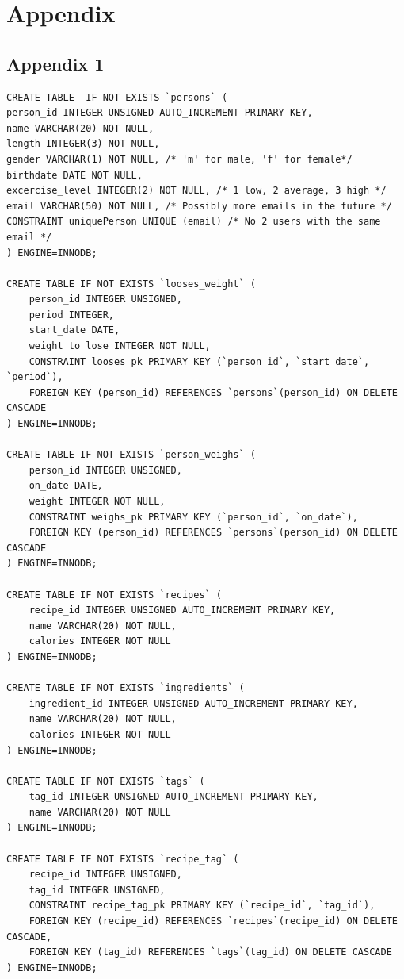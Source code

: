 \documentclass{article}
\begin{document}
\section*{Appendix}
\subsection*{Appendix 1}
\begin{lstlisting}[caption=Script of database]
CREATE TABLE  IF NOT EXISTS `persons` (
person_id INTEGER UNSIGNED AUTO_INCREMENT PRIMARY KEY,
name VARCHAR(20) NOT NULL,
length INTEGER(3) NOT NULL,
gender VARCHAR(1) NOT NULL, /* 'm' for male, 'f' for female*/
birthdate DATE NOT NULL,
excercise_level INTEGER(2) NOT NULL, /* 1 low, 2 average, 3 high */
email VARCHAR(50) NOT NULL, /* Possibly more emails in the future */
CONSTRAINT uniquePerson UNIQUE (email) /* No 2 users with the same email */
) ENGINE=INNODB;

CREATE TABLE IF NOT EXISTS `looses_weight` (
    person_id INTEGER UNSIGNED,
    period INTEGER,
    start_date DATE,
    weight_to_lose INTEGER NOT NULL,
    CONSTRAINT looses_pk PRIMARY KEY (`person_id`, `start_date`, `period`),
    FOREIGN KEY (person_id) REFERENCES `persons`(person_id) ON DELETE CASCADE
) ENGINE=INNODB;

CREATE TABLE IF NOT EXISTS `person_weighs` (
    person_id INTEGER UNSIGNED,
    on_date DATE,
    weight INTEGER NOT NULL,
    CONSTRAINT weighs_pk PRIMARY KEY (`person_id`, `on_date`),
    FOREIGN KEY (person_id) REFERENCES `persons`(person_id) ON DELETE CASCADE
) ENGINE=INNODB;

CREATE TABLE IF NOT EXISTS `recipes` (
    recipe_id INTEGER UNSIGNED AUTO_INCREMENT PRIMARY KEY,
    name VARCHAR(20) NOT NULL,
    calories INTEGER NOT NULL
) ENGINE=INNODB;

CREATE TABLE IF NOT EXISTS `ingredients` (
    ingredient_id INTEGER UNSIGNED AUTO_INCREMENT PRIMARY KEY,
    name VARCHAR(20) NOT NULL,
    calories INTEGER NOT NULL
) ENGINE=INNODB;

CREATE TABLE IF NOT EXISTS `tags` (
    tag_id INTEGER UNSIGNED AUTO_INCREMENT PRIMARY KEY,
    name VARCHAR(20) NOT NULL
) ENGINE=INNODB;

CREATE TABLE IF NOT EXISTS `recipe_tag` (
    recipe_id INTEGER UNSIGNED,
    tag_id INTEGER UNSIGNED,
    CONSTRAINT recipe_tag_pk PRIMARY KEY (`recipe_id`, `tag_id`),
    FOREIGN KEY (recipe_id) REFERENCES `recipes`(recipe_id) ON DELETE CASCADE,
    FOREIGN KEY (tag_id) REFERENCES `tags`(tag_id) ON DELETE CASCADE
) ENGINE=INNODB;


\end{lstlisting}
\end{document}
